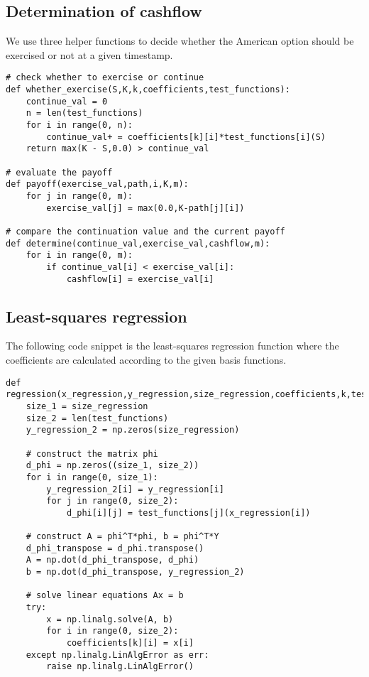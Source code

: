 \documentclass[11pt, oneside]{article}   	%
\begin{document}
\subsection{Determination of cashflow}
We use three helper functions to decide whether the American option should be exercised or not at a given timestamp.
\lstset{language=Python}
\lstset{frame=lines}
\lstset{basicstyle=\footnotesize}
\begin{lstlisting}
# check whether to exercise or continue
def whether_exercise(S,K,k,coefficients,test_functions):
    continue_val = 0
    n = len(test_functions)
    for i in range(0, n):
        continue_val+ = coefficients[k][i]*test_functions[i](S)
    return max(K - S,0.0) > continue_val
    
# evaluate the payoff
def payoff(exercise_val,path,i,K,m):
    for j in range(0, m):
        exercise_val[j] = max(0.0,K-path[j][i])
        
# compare the continuation value and the current payoff
def determine(continue_val,exercise_val,cashflow,m):
    for i in range(0, m):
        if continue_val[i] < exercise_val[i]:
            cashflow[i] = exercise_val[i]
\end{lstlisting}


\subsection{Least-squares regression}
The following code snippet is the least-squares regression function where the coefficients are calculated according to the given basis functions.
\lstset{language=Python}
\lstset{frame=lines}
\lstset{basicstyle=\footnotesize}
\begin{lstlisting}
def regression(x_regression,y_regression,size_regression,coefficients,k,test_functions):
    size_1 = size_regression
    size_2 = len(test_functions)
    y_regression_2 = np.zeros(size_regression)

    # construct the matrix phi
    d_phi = np.zeros((size_1, size_2))
    for i in range(0, size_1):
        y_regression_2[i] = y_regression[i]
        for j in range(0, size_2):
            d_phi[i][j] = test_functions[j](x_regression[i])

    # construct A = phi^T*phi, b = phi^T*Y
    d_phi_transpose = d_phi.transpose()
    A = np.dot(d_phi_transpose, d_phi)
    b = np.dot(d_phi_transpose, y_regression_2)

    # solve linear equations Ax = b
    try:
        x = np.linalg.solve(A, b)
        for i in range(0, size_2):
            coefficients[k][i] = x[i]
    except np.linalg.LinAlgError as err:
        raise np.linalg.LinAlgError()
\end{lstlisting}
\end{document}
